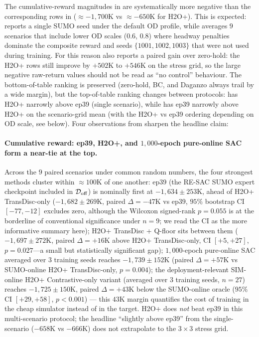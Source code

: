 The cumulative-reward magnitudes in  are systematically more negative than the corresponding rows in  ($\approx -1{,}700$K vs $\approx -650$K for H2O+).
This is expected:  reports a single SUMO seed under the default OD profile, while  averages $9$ scenarios that include lower OD scales ($0.6$, $0.8$) where headway penalties dominate the composite reward and seeds $\{1001, 1002, 1003\}$ that were not used during training.
For this reason  also reports a paired gain over zero-hold: the H2O+ rows still improve by $+502$K to $+546$K on the stress grid, so the large negative raw-return values should not be read as ``no control'' behaviour.
The bottom-of-table ranking is preserved (zero-hold, BC, and Daganzo always trail by a wide margin), but the top-of-table ranking changes between protocols:  has H2O+ narrowly above ep39 (single scenario), while  has ep39 narrowly above H2O+ on the scenario-grid mean (with the H2O+ vs ep39 ordering depending on OD scale, see below).
Four observations from  sharpen the headline claim:

\paragraph{Cumulative reward: ep39, H2O+, and $1{,}000$-epoch pure-online SAC form a near-tie at the top.}
Across the $9$ paired scenarios under common random numbers, the four strongest methods cluster within $\approx 100$K of one another:
ep39 (the RE-SAC SUMO expert checkpoint included in $\mathcal{D}_{\mathrm{off}}$) is nominally first at $-1{,}634 \pm 253$K, ahead of H2O+ TransDisc-only ($-1{,}682 \pm 269$K, paired $\Delta = -47$K vs ep39, $95\%$ bootstrap CI $[-77, -12]$ excludes zero, although the Wilcoxon signed-rank $p = 0.055$ is at the borderline of conventional significance under $n = 9$; we read the CI as the more informative summary here);
H2O+ TransDisc + Q-floor sits between them ($-1{,}697 \pm 272$K, paired $\Delta = +16$K above H2O+ TransDisc-only, CI $[+5, +27]$, $p = 0.027$---a small but statistically significant gap);
$1{,}000$-epoch pure-online SAC averaged over $3$ training seeds reaches $-1{,}739 \pm 152$K (paired $\Delta = +57$K vs SUMO-online H2O+ TransDisc-only, $p = 0.004$);
the deployment-relevant SIM-online H2O+ Contrastive-only variant (averaged over $3$ training seeds, $n = 27$) reaches $-1{,}725 \pm 150$K, paired $\Delta = +43$K below the SUMO-online oracle ($95\%$ CI $[+29, +58]$, $p < 0.001$) --- this $43$K margin quantifies the cost of training in the cheap simulator instead of in the target.
H2O+ does \emph{not} beat ep39 in this multi-scenario protocol; the headline ``slightly above ep39'' from the single-scenario  ($-658$K vs $-666$K) does not extrapolate to the $3 \times 3$ stress grid.

